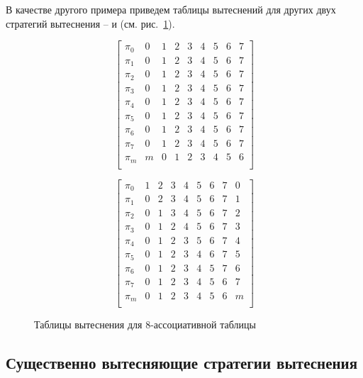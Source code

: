 \begin{enumerate}
В качестве другого примера приведем таблицы вытеснений для других двух стратегий
вытеснения -- \FIFO и \MRU (см. рис.~\ref{fig:fifo_mru_tables}).

\begin{figure}[h] \centering
\parbox{0.4\textwidth}{
$$ \left[
     \begin{array}{c|cccccccc}
       \pi_0 & 0 & 1 & 2 & 3 & 4 & 5 & 6 & 7 \\
       \pi_1 & 0 & 1 & 2 & 3 & 4 & 5 & 6 & 7 \\
       \pi_2 & 0 & 1 & 2 & 3 & 4 & 5 & 6 & 7 \\
       \pi_3 & 0 & 1 & 2 & 3 & 4 & 5 & 6 & 7 \\
       \pi_4 & 0 & 1 & 2 & 3 & 4 & 5 & 6 & 7 \\
       \pi_5 & 0 & 1 & 2 & 3 & 4 & 5 & 6 & 7 \\
       \pi_6 & 0 & 1 & 2 & 3 & 4 & 5 & 6 & 7 \\
       \pi_7 & 0 & 1 & 2 & 3 & 4 & 5 & 6 & 7 \\
       \pi_m & m & 0 & 1 & 2 & 3 & 4 & 5 & 6 \\
     \end{array}
   \right]$$
\center \FIFO} \qquad
\parbox{0.4\textwidth}{
$$ \left[
     \begin{array}{c|cccccccc}
       \pi_0 & 1 & 2 & 3 & 4 & 5 & 6 & 7 & 0 \\
       \pi_1 & 0 & 2 & 3 & 4 & 5 & 6 & 7 & 1 \\
       \pi_2 & 0 & 1 & 3 & 4 & 5 & 6 & 7 & 2 \\
       \pi_3 & 0 & 1 & 2 & 4 & 5 & 6 & 7 & 3 \\
       \pi_4 & 0 & 1 & 2 & 3 & 5 & 6 & 7 & 4 \\
       \pi_5 & 0 & 1 & 2 & 3 & 4 & 6 & 7 & 5 \\
       \pi_6 & 0 & 1 & 2 & 3 & 4 & 5 & 7 & 6 \\
       \pi_7 & 0 & 1 & 2 & 3 & 4 & 5 & 6 & 7 \\
       \pi_m & 0 & 1 & 2 & 3 & 4 & 5 & 6 & m \\
     \end{array}
   \right]$$
\center \MRU } \caption{Таблицы вытеснения для 8-ассоциативной
таблицы}\label{fig:fifo_mru_tables}
\end{figure}

\subsection{Существенно вытесняющие стратегии вытеснения}\label{sec:essentially_displacing}


\end{enumerate}
